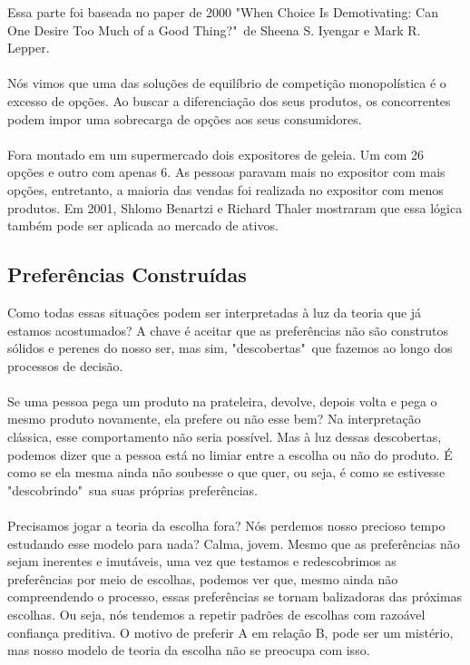\documentclass[a4paper,11pt,oneside]{book}
\theoremstyle{definition}
\theoremstyle{break}
\begin{document}
Essa parte foi baseada no paper de 2000 "When Choice Is Demotivating: Can One Desire Too Much of a Good Thing?"\ de Sheena S. Iyengar e Mark R. Lepper.
\\
\\
Nós vimos que uma das soluções de equilíbrio de competição monopolística é o excesso de opções. Ao buscar a diferenciação dos seus produtos, os concorrentes podem impor uma sobrecarga de opções aos seus consumidores.
\\
\\
Fora montado em um supermercado dois expositores de geleia. Um com 26 opções e outro com apenas 6. As pessoas paravam mais no expositor com mais opções, entretanto, a maioria das vendas foi realizada no expositor com menos produtos. Em 2001, Shlomo Benartzi e Richard Thaler mostraram que essa lógica também pode ser aplicada ao mercado de ativos.

\subsection{Preferências Construídas}

Como todas essas situações podem ser interpretadas à luz da teoria que já estamos acostumados? A chave é aceitar que as preferências não são construtos sólidos e perenes do nosso ser, mas sim, "descobertas"\ que fazemos ao longo dos processos de decisão.
\\
\\
Se uma pessoa pega um produto na prateleira, devolve, depois volta e pega o mesmo produto novamente, ela prefere ou não esse bem? Na interpretação clássica, esse comportamento não seria possível. Mas à luz dessas descobertas, podemos dizer que a pessoa está no limiar entre a escolha ou não do produto. É como se ela mesma ainda não soubesse o que quer, ou seja, é como se estivesse "descobrindo"\ sua suas próprias preferências.
\\
\\
Precisamos jogar a teoria da escolha fora? Nós perdemos nosso precioso tempo estudando esse modelo para nada? Calma, jovem. Mesmo que as preferências não sejam inerentes e imutáveis, uma vez que testamos e redescobrimos as preferências por meio de escolhas, podemos ver que, mesmo ainda não compreendendo o processo, essas preferências se tornam balizadoras das próximas escolhas. Ou seja, nós tendemos a repetir padrões de escolhas com razoável confiança preditiva. O motivo de preferir A em relação B, pode ser um mistério, mas nosso modelo de teoria da escolha não se preocupa com isso.
\end{document}
